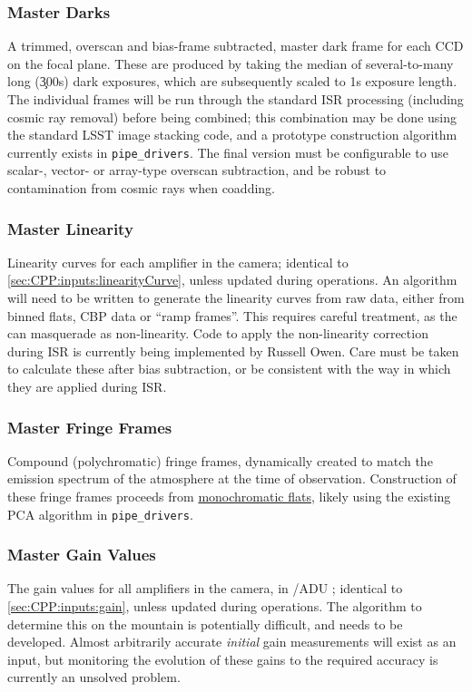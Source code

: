 \subsubsection{Master Darks}\label{sec:CPP:output:dark}
A trimmed, overscan and bias-frame subtracted, master dark frame for each CCD on the focal plane. These are produced by taking the median of several-to-many long (\c 300s) dark exposures, which are subsequently scaled to 1s exposure length.
\alg The individual frames will be run through the standard ISR processing (including cosmic ray removal) before
being combined; this combination may be done using the standard LSST image stacking code, and a prototype construction algorithm currently exists in \texttt{pipe\_drivers}. The final version must be configurable to use scalar-, vector- or array-type overscan subtraction, and be robust to contamination from cosmic rays when coadding.

\subsubsection{Master Linearity}\label{sec:CPP:output:linearityCurve}
Linearity curves for each amplifier in the camera; identical to \secsymbol\ref{sec:CPP:inputs:linearityCurve}, unless updated during operations.
\alg An algorithm will need to be written to generate the linearity curves from raw data, either from binned flats, CBP data or ``ramp frames''. This requires careful treatment, as the \bfeffect can masquerade as non-linearity. Code to apply the non-linearity correction during ISR is currently being implemented by Russell Owen. Care must be taken to calculate these after bias subtraction, or be consistent with the way in which they are applied during ISR.


\subsubsection{Master Fringe Frames}\label{sec:CPP:output:fringeFrames}
Compound (polychromatic) fringe frames, dynamically created to match the emission spectrum of the atmosphere at the time of observation.
\alg Construction of these fringe frames proceeds from \hyperref[sec:CPP:output:monoPhotoFlat]{monochromatic flats}, likely using the existing PCA algorithm in \texttt{pipe\_drivers}.


\subsubsection{Master Gain Values}\label{sec:CPP:output:gains}
The gain values for all amplifiers in the camera, in \electron/ADU ; identical to \secsymbol\ref{sec:CPP:inputs:gain}, unless updated during operations.
\alg The algorithm to determine this on the mountain is potentially difficult, and needs to be developed. Almost arbitrarily accurate \emph{initial} gain measurements will exist as an input, but monitoring the evolution of these gains to the required accuracy is currently an unsolved problem.

